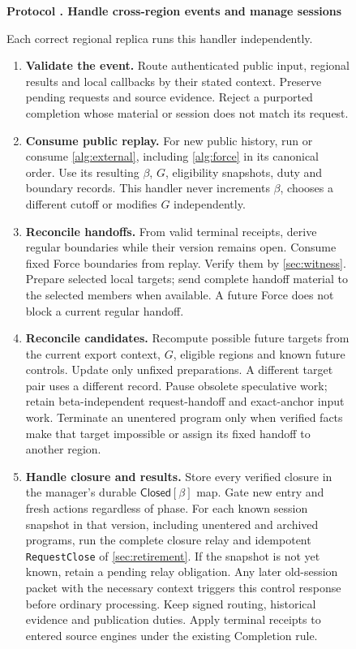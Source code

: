 \documentclass[11pt,a4paper]{article}
\newcommand{\tagg}[1]{\ensuremath{\mathsf{#1}}}
\newcounter{protocol}
\newenvironment{protocol}[3][htbp]{\begin{figure}[#1]\refstepcounter{protocol}\label{#2}
\begin{mdframed}[linewidth=.6pt,skipabove=0pt,skipbelow=0pt,
innertopmargin=7pt,innerbottommargin=7pt]\small
\textbf{Protocol \theprotocol. #3}\par\smallskip}{\end{mdframed}\end{figure}}
\begin{document}
\begin{protocol}[H]{alg:rotation}{Handle cross-region events and manage sessions}
Each correct regional replica runs this handler independently.
\begin{enumerate}[label=\textbf{\arabic*)},itemsep=3pt]
\item \textbf{Validate the event.} Route authenticated public input,
regional results and local callbacks by their stated context. Preserve
pending requests and source evidence. Reject a purported completion
whose material or session does not match its request.
\item \textbf{Consume public replay.} For new public history, run or
consume \cref{alg:external}, including \cref{alg:force} in its canonical
order. Use its resulting $\beta$, $G$, eligibility snapshots, duty and
boundary records. This handler never increments $\beta$, chooses a
different cutoff or modifies $G$ independently.
\item \textbf{Reconcile handoffs.} From valid terminal receipts,
derive regular boundaries while their version remains open. Consume
fixed Force boundaries from replay. Verify them by
\cref{sec:witness}. Prepare selected local targets; send complete
handoff material to the selected members when available. A future
Force does not block a current regular handoff.
\item \textbf{Reconcile candidates.} Recompute possible future
targets from the current export context, $G$, eligible regions and
known future controls. Update only unfixed preparations. A different
target pair uses a different record. Pause obsolete speculative work;
retain beta-independent request-handoff and exact-anchor input work.
Terminate an unentered program only when verified facts make that
target impossible or assign its fixed handoff to another region.
\item \textbf{Handle closure and results.} Store every verified closure
in the manager's durable $\tagg{Closed}[\beta]$ map. Gate new entry and
fresh actions regardless of phase. For each known session snapshot in
that version, including unentered and archived programs, run the complete
closure relay and idempotent \texttt{RequestClose} of \cref{sec:retirement}.
If the snapshot is not yet known, retain a pending relay obligation.
Any later old-session packet with the necessary context triggers this
control response before ordinary processing. Keep signed routing,
historical evidence and publication duties. Apply terminal receipts
to entered source engines under the existing Completion rule.

\end{enumerate}
\end{protocol}
\end{document}
